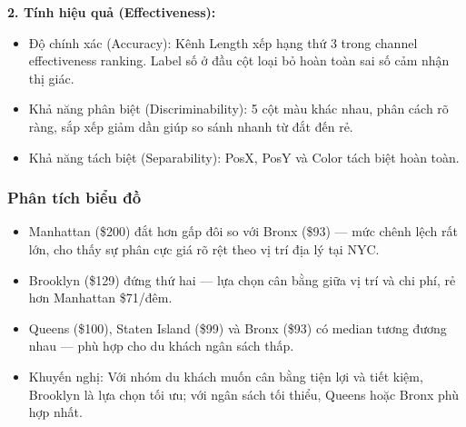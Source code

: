\textbf{2. Tính hiệu quả (Effectiveness):}

\begin{itemize}
    \item Độ chính xác (Accuracy): Kênh Length xếp hạng thứ 3 trong channel effectiveness ranking. Label số ở đầu cột loại bỏ hoàn toàn sai số cảm nhận thị giác.
    \item Khả năng phân biệt (Discriminability): 5 cột màu khác nhau, phân cách rõ ràng, sắp xếp giảm dần giúp so sánh nhanh từ đắt đến rẻ.
    \item Khả năng tách biệt (Separability): PosX, PosY và Color tách biệt hoàn toàn.
\end{itemize}

\subsubsection{Phân tích biểu đồ}

\begin{itemize}
    \item Manhattan (\$200) đắt hơn gấp đôi so với Bronx (\$93) --- mức chênh lệch rất lớn, cho thấy sự phân cực giá rõ rệt theo vị trí địa lý tại NYC.
    \item Brooklyn (\$129) đứng thứ hai --- lựa chọn cân bằng giữa vị trí và chi phí, rẻ hơn Manhattan \$71/đêm.
    \item Queens (\$100), Staten Island (\$99) và Bronx (\$93) có median tương đương nhau --- phù hợp cho du khách ngân sách thấp.
    \item Khuyến nghị: Với nhóm du khách muốn cân bằng tiện lợi và tiết kiệm, Brooklyn là lựa chọn tối ưu; với ngân sách tối thiểu, Queens hoặc Bronx phù hợp nhất.
\end{itemize}
